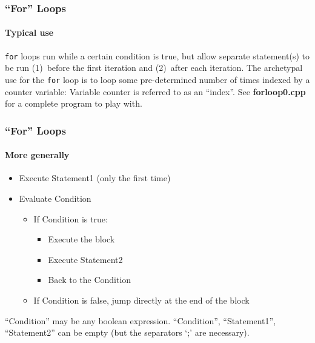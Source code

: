 \documentclass[12pt]{beamer}
\begin{document}
\begin{frame}
  \frametitle{``For'' Loops}
  \framesubtitle{Typical use}
	\lstinline/for/ loops run while a certain condition is true, but allow separate statement(s) to be run (1)~before the first iteration and (2)~after each iteration.
    The archetypal use for the \lstinline/for/ loop is to loop some pre-determined number of times indexed by a counter variable:
    \LstForBlackboard
    Variable counter is referred to as an ``index''. 
    See \textbf{forloop0.cpp} for a complete program to play with.
\end{frame}


\begin{frame}
  \frametitle{``For'' Loops}
  \framesubtitle{More generally}
	\LstFor
    \begin{itemize}
    \item   Execute Statement1 (only the first time)
    \item   Evaluate Condition
    \begin{itemize}
        \item If Condition is true:
        \begin{itemize} 
            \item Execute the block
            \item Execute Statement2
            \item Back to the Condition
        \end{itemize}
        \item If Condition is false, jump directly at the end of the block
    \end{itemize}
    \end{itemize}
    ``Condition'' may be any boolean expression.
    ``Condition'', ``Statement1'', ``Statement2'' can be empty (but the separators `;' are necessary).
\end{frame}
\end{document}
